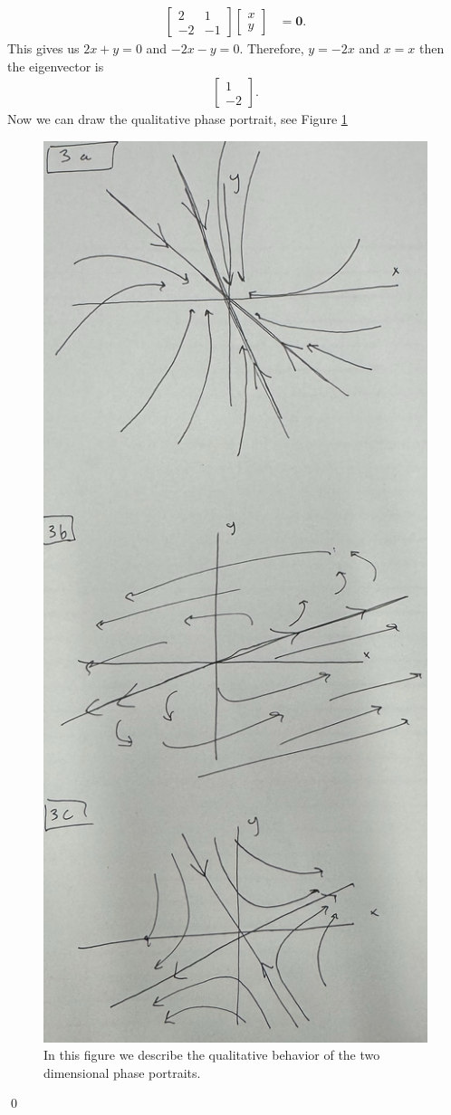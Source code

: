 \documentclass[10pt]{amsart}
\theoremstyle{nonumberplain}
\begin{document}
\begin{enumerate}[label={\bf {\arabic*}:}]
\begin{enumerate}
\begin{align*}
\begin{bmatrix} 2 & 1 \\ -2 & -1 \end{bmatrix}
\begin{bmatrix} x \\ y \end{bmatrix}
	&= \bm { 0 }.
\end{align*}
This gives us $2x + y = 0$ and $-2x -y = 0$.
Therefore, $y = -2x$ and $x = x$ then the eigenvector is
\begin{align*}
\begin{bmatrix} 1 \\ -2 \end{bmatrix}.
\end{align*}
Now we can draw the qualitative phase portrait, see Figure \ref{fig:f4}

\begin{figure}[h]
	\centering
	\includegraphics[height=.8\textwidth]{3_a_c.png}
 	\caption{In this figure we describe the qualitative behavior of the two dimensional phase portraits.}
	\label{fig:f4}
\end{figure}
\qed \\


\end{enumerate}
\end{enumerate}
\end{document}

